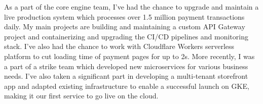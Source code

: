 \begin{minipage}[t]{\linewidth}
\vspace{\contentTopMarginAlt} %
{\contentFont As a part of the core engine team, I've had the chance to upgrade and maintain a live production system which processes over 1.5 million payment transactions daily. My main projects are building and maintaining a custom API Gateway project and containerizing and upgrading the CI/CD pipelines and monitoring stack. I've also had the chance to work with Cloudflare Workers serverless platform to cut loading time of payment pages for up to 2s. More recently, I was a part of a strike team which developed new microservices for various business needs. I've also taken a significant part in developing a multi-tenant storefront app and adapted existing infrastructure to enable a successful launch on GKE, making it our first service to go live on the cloud. }%
\end{minipage}\newline%
%